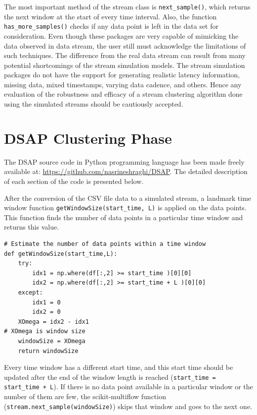 The most important method of the stream class is \texttt{next\_sample()}, which returns the next window at the start of every time interval. Also, the function \texttt{has\_more\_samples()} checks if any data point is left in the data set for consideration. Even though these packages are very capable of mimicking the data observed in data stream, the user still must acknowledge the limitations of such techniques. The difference from the real data stream can result from many potential shortcomings of the stream simulation models. The stream simulation packages do not have the support for generating realistic latency information, missing data, mixed timestamps, varying data cadence, and others. Hence any evaluation of the robustness and efficacy of a stream clustering algorithm done using the simulated streams should be cautiously accepted. 


\section{DSAP Clustering Phase}

The DSAP source code in Python programming language has been made freely available at: \url{https://github.com/nasrineshraghi/DSAP}. The detailed description of each section of the code is presented below.

After the conversion of the CSV file data to a simulated stream, a landmark time window function \texttt{getWindowSize(start\_time, L)} is applied on the data points. This function finds the number of data points in a particular time window and returns this value. 

\begin{lstlisting}
# Estimate the number of data points within a time window
def getWindowSize(start_time,L):
    try:
        idx1 = np.where(df[:,2] >= start_time )[0][0]
        idx2 = np.where(df[:,2] >= start_time + L )[0][0] 
    except:
        idx1 = 0
        idx2 = 0
    XOmega = idx2 - idx1
# XOmega is window size
    windowSize = XOmega
    return windowSize
\end{lstlisting}


Every time window has a different start time, and this start time should be updated after the end of the window length is reached (\texttt{start\_time = start\_time + L}). If there is no data point available in a particular window or the number of them are few, the scikit-multiflow function (\texttt{stream.next\_sample(windowSize)}) skips that window and goes to the next one.

